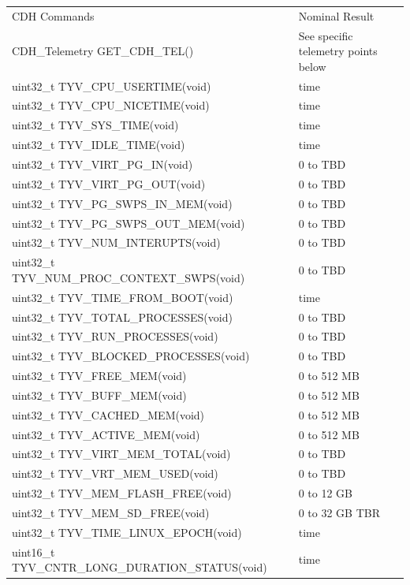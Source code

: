 \documentclass{article}
\begin{document}
\newpage
\begin{tabular}{|l|l|}
	\hline
	CDH Commands      &  Nominal Result                \\ \hhline{|=|=|}
	CDH_Telemetry GET_CDH_TEL() & See specific telemetry points below \\ \hline
	uint32_t TYV_CPU_USERTIME(void) & time \\ \hline
	uint32_t TYV_CPU_NICETIME(void) & time \\ \hline
	uint32_t TYV_SYS_TIME(void) & time \\ \hline
	uint32_t TYV_IDLE_TIME(void) & time \\ \hline
	uint32_t TYV_VIRT_PG_IN(void) & 0 to TBD \\ \hline
	uint32_t TYV_VIRT_PG_OUT(void) & 0 to TBD \\ \hline
	uint32_t TYV_PG_SWPS_IN_MEM(void) & 0 to TBD \\ \hline
	uint32_t TYV_PG_SWPS_OUT_MEM(void) & 0 to TBD \\ \hline
	uint32_t TYV_NUM_INTERUPTS(void) & 0 to TBD \\ \hline
	uint32_t TYV_NUM_PROC_CONTEXT_SWPS(void) & 0 to TBD \\ \hline
	uint32_t TYV_TIME_FROM_BOOT(void) & time \\ \hline
	uint32_t TYV_TOTAL_PROCESSES(void) & 0 to TBD \\ \hline
	uint32_t TYV_RUN_PROCESSES(void) & 0 to TBD \\ \hline
	uint32_t TYV_BLOCKED_PROCESSES(void) & 0 to TBD \\ \hline
	uint32_t TYV_FREE_MEM(void) & 0 to 512 MB \\ \hline
	uint32_t TYV_BUFF_MEM(void) & 0 to 512 MB \\ \hline
	uint32_t TYV_CACHED_MEM(void) & 0 to 512 MB \\ \hline
	uint32_t TYV_ACTIVE_MEM(void) & 0 to 512 MB \\ \hline
	uint32_t TYV_VIRT_MEM_TOTAL(void) & 0 to TBD \\ \hline
	uint32_t TYV_VRT_MEM_USED(void) & 0 to TBD \\ \hline
	uint32_t TYV_MEM_FLASH_FREE(void) & 0 to 12 GB \\ \hline
	uint32_t TYV_MEM_SD_FREE(void) & 0 to 32 GB TBR \\ \hline
	uint32_t TYV_TIME_LINUX_EPOCH(void) & time \\ \hline
	uint16_t TYV_CNTR_LONG_DURATION_STATUS(void) & time \\ \hline
\end{tabular}
\end{document}
